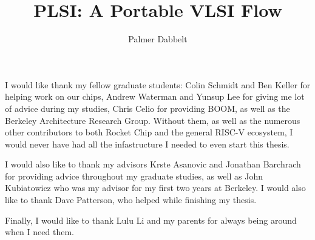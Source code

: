 \documentclass[masters]{ucbthesis}
\author{Palmer Dabbelt}
\title{PLSI: A Portable VLSI Flow}
\begin{document}
\maketitle
\approvalpage
\copyrightpage

\begin{frontmatter}

\tableofcontents
\clearpage
\listoffigures

\begin{acknowledgements}
I would like thank my fellow graduate students: Colin Schmidt and Ben Keller
for helping work on our chips, Andrew Waterman and Yunsup Lee for giving me lot
of advice during my studies, Chris Celio for providing BOOM, as well as the
Berkeley Architecture Research Group.  Without them, as well as the numerous
other contributors to both Rocket Chip and the general RISC-V ecosystem, I
would never have had all the infastructure I needed to even start this thesis.

I would also like to thank my advisors Krste Asanovic and Jonathan Barchrach
for providing advice throughout my graduate studies, as well as John
Kubiatowicz who was my advisor for my first two years at Berkeley.  I would
also like to thank Dave Patterson, who helped while finishing my thesis.

Finally, I would like to thank Lulu Li and my parents for always being around
when I need them.
\end{acknowledgements}

\end{frontmatter}

\pagestyle{headings}





\end{document}
